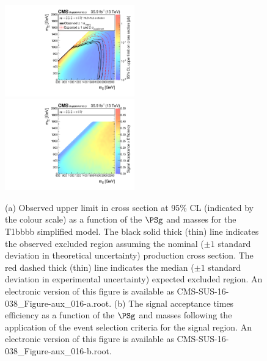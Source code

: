 \begin{figure}
    \begin{center}
            \includegraphics[width=0.50\textwidth]{Supplementary/CMS-SUS-16-038_Figure-aux_016-a}
            \includegraphics[width=0.50\textwidth]{Supplementary/CMS-SUS-16-038_Figure-aux_016-b}
        \caption{ (a) Observed upper limit in cross section at 95\% CL (indicated
        by the colour scale) as a function of 
        the $\PSg$ and \PSGczDo %
        masses for the 
        T1bbbb %
        simplified  model.  The  black  solid thick  (thin)  line indicates  the
        observed  excluded  region  assuming   the  nominal  (${\pm}1$  standard
        deviation in theoretical uncertainty)  production cross section. The red
        dashed  thick  (thin)  line  indicates  the  median  (${\pm}1$  standard
        deviation in experimental uncertainty) expected excluded region.
    An electronic version of this figure is available as CMS-SUS-16-038\_Figure-aux\_016-a.root.
        (b) The signal acceptance times efficiency as a function of 
        the $\PSg$ and \PSGczDo %
        masses following the application of the event selection criteria for the signal region.
    An electronic version of this figure is available as CMS-SUS-16-038\_Figure-aux\_016-b.root.
        }
        \label{fig:T1bbbb}
    \end{center}
\end{figure}

